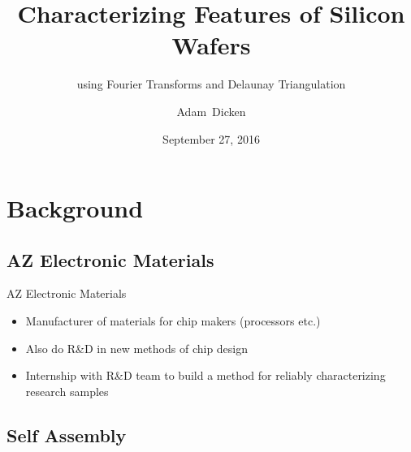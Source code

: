 \documentclass{beamer}
\title[Characterizing Features of Silicon Wafers] %
{Characterizing Features of Silicon Wafers}
\date{September 27, 2016}
\subtitle
{using Fourier Transforms and Delaunay Triangulation } %
\author[Adam Dicken] %
{Adam~Dicken}
\begin{document}
\begin{frame}
  \titlepage
\end{frame}

  





\section{Background}

\subsection{AZ Electronic Materials}

\begin{frame}{AZ Electronic Materials}
	\begin{itemize}
		\item
		Manufacturer of materials for chip makers (processors etc.)
		\item
		Also do R\&D in new methods of chip design
		\item 
		Internship with R\&D team to build a method for reliably characterizing research samples
	\end{itemize}
\end{frame}

\subsection{Self Assembly}
\end{document}
